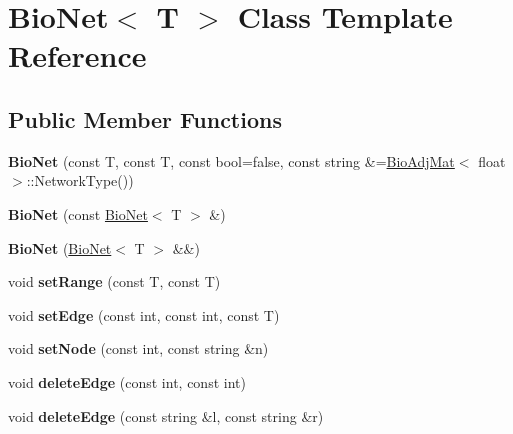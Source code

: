 \hypertarget{class_bio_net}{}\section{Bio\+Net$<$ T $>$ Class Template Reference}
\label{class_bio_net}
\subsection*{Public Member Functions}
\begin{DoxyCompactItemize}
\item 
\mbox{\label{class_bio_net_af18d85c34aa8d04e8ddea94c256b2ac6}} 
{\bfseries Bio\+Net} (const T, const T, const bool=false, const string \&=\hyperlink{class_bio_adj_mat}{Bio\+Adj\+Mat}$<$ float $>$\+::Network\+Type())
\item 
\mbox{\label{class_bio_net_a6ac93ccd7e25a7de6acbfd3af0355a67}} 
{\bfseries Bio\+Net} (const \hyperlink{class_bio_net}{Bio\+Net}$<$ T $>$ \&)
\item 
\mbox{\label{class_bio_net_a0775e0b7bfa4f50c6ff595f915d00c69}} 
{\bfseries Bio\+Net} (\hyperlink{class_bio_net}{Bio\+Net}$<$ T $>$ \&\&)
\item 
\mbox{\label{class_bio_net_a51934a34817c3dab71e6a796e02f9850}} 
void {\bfseries set\+Range} (const T, const T)
\item 
\mbox{\label{class_bio_net_a255b8c04b7ebb8acf164ecd66cfd2e2c}} 
void {\bfseries set\+Edge} (const int, const int, const T)
\item 
\mbox{\label{class_bio_net_a91d6454117016366898cb40c43cb6fd5}} 
void {\bfseries set\+Node} (const int, const string \&n)
\item 
\mbox{\label{class_bio_net_af3b15d9a7e155670b906dd6cb4c03fc4}} 
void {\bfseries delete\+Edge} (const int, const int)
\item 
\mbox{\label{class_bio_net_a78d341c6d9fade83aec1bcb569d02909}} 
void {\bfseries delete\+Edge} (const string \&l, const string \&r)
\item 
\mbox{\label{class_bio_net_a9dc1a7c48aa9078413c96d2f39ef0c0d}} 

\end{DoxyCompactItemize}
